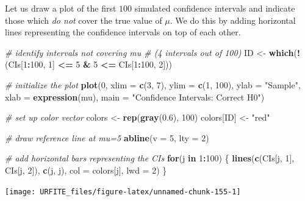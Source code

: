 \documentclass[]{book}
\newenvironment{Shaded}{\begin{snugshade}}{\end{snugshade}}
\newcommand{\KeywordTok}[1]{\textcolor[rgb]{0.13,0.29,0.53}{\textbf{#1}}}
\newcommand{\DataTypeTok}[1]{\textcolor[rgb]{0.13,0.29,0.53}{#1}}
\newcommand{\DecValTok}[1]{\textcolor[rgb]{0.00,0.00,0.81}{#1}}
\newcommand{\FloatTok}[1]{\textcolor[rgb]{0.00,0.00,0.81}{#1}}
\newcommand{\StringTok}[1]{\textcolor[rgb]{0.31,0.60,0.02}{#1}}
\newcommand{\CommentTok}[1]{\textcolor[rgb]{0.56,0.35,0.01}{\textit{#1}}}
\newcommand{\ControlFlowTok}[1]{\textcolor[rgb]{0.13,0.29,0.53}{\textbf{#1}}}
\newcommand{\OperatorTok}[1]{\textcolor[rgb]{0.81,0.36,0.00}{\textbf{#1}}}
\newcommand{\NormalTok}[1]{#1}
\theoremstyle{definition}
\theoremstyle{definition}
\theoremstyle{definition}
\theoremstyle{remark}
\begin{document}
Let us draw a plot of the first \(100\) simulated confidence intervals
and indicate those which \emph{do not} cover the true value of \(\mu\).
We do this by adding horizontal lines representing the confidence
intervals on top of each other.

\begin{Shaded}
\begin{Highlighting}[]
\CommentTok{# identify intervals not covering mu}
\CommentTok{# (4 intervals out of 100)}
\NormalTok{ID <-}\StringTok{ }\KeywordTok{which}\NormalTok{(}\OperatorTok{!}\NormalTok{(CIs[}\DecValTok{1}\OperatorTok{:}\DecValTok{100}\NormalTok{, }\DecValTok{1}\NormalTok{] }\OperatorTok{<=}\StringTok{ }\DecValTok{5} \OperatorTok{&}\StringTok{ }\DecValTok{5} \OperatorTok{<=}\StringTok{ }\NormalTok{CIs[}\DecValTok{1}\OperatorTok{:}\DecValTok{100}\NormalTok{, }\DecValTok{2}\NormalTok{]))}

\CommentTok{# initialize the plot}
\KeywordTok{plot}\NormalTok{(}\DecValTok{0}\NormalTok{, }
     \DataTypeTok{xlim =} \KeywordTok{c}\NormalTok{(}\DecValTok{3}\NormalTok{, }\DecValTok{7}\NormalTok{), }
     \DataTypeTok{ylim =} \KeywordTok{c}\NormalTok{(}\DecValTok{1}\NormalTok{, }\DecValTok{100}\NormalTok{), }
     \DataTypeTok{ylab =} \StringTok{"Sample"}\NormalTok{, }
     \DataTypeTok{xlab =} \KeywordTok{expression}\NormalTok{(mu), }
     \DataTypeTok{main =} \StringTok{"Confidence Intervals: Correct H0"}\NormalTok{)}

\CommentTok{# set up color vector}
\NormalTok{colors <-}\StringTok{ }\KeywordTok{rep}\NormalTok{(}\KeywordTok{gray}\NormalTok{(}\FloatTok{0.6}\NormalTok{), }\DecValTok{100}\NormalTok{)}
\NormalTok{colors[ID] <-}\StringTok{ "red"}

\CommentTok{# draw reference line at mu=5}
\KeywordTok{abline}\NormalTok{(}\DataTypeTok{v =} \DecValTok{5}\NormalTok{, }\DataTypeTok{lty =} \DecValTok{2}\NormalTok{)}

\CommentTok{# add horizontal bars representing the CIs}
\ControlFlowTok{for}\NormalTok{(j }\ControlFlowTok{in} \DecValTok{1}\OperatorTok{:}\DecValTok{100}\NormalTok{) \{}
  \KeywordTok{lines}\NormalTok{(}\KeywordTok{c}\NormalTok{(CIs[j, }\DecValTok{1}\NormalTok{], CIs[j, }\DecValTok{2}\NormalTok{]), }
        \KeywordTok{c}\NormalTok{(j, j), }
        \DataTypeTok{col =}\NormalTok{ colors[j], }
        \DataTypeTok{lwd =} \DecValTok{2}\NormalTok{)}
\NormalTok{\}}
\end{Highlighting}
\end{Shaded}

\begin{center}\texttt{[image: URFITE\_files/figure-latex/unnamed-chunk-155-1]} \end{center}
\end{document}
